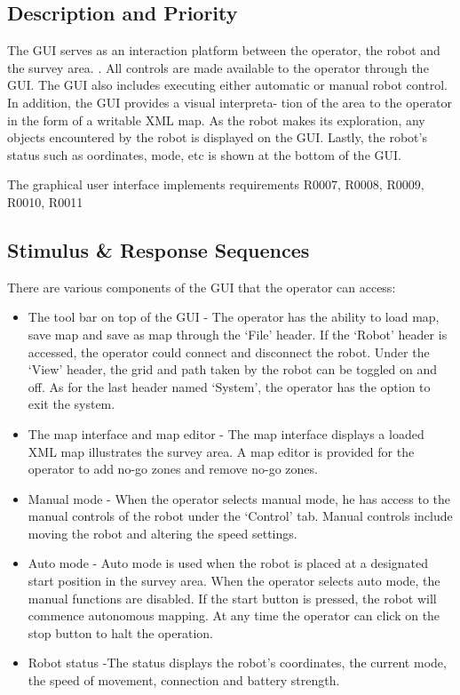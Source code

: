 \documentclass[11pt, a4paper]{report}
\begin{document}
\subsection {Description and Priority}
The GUI serves as an interaction platform between the operator, the robot and the survey area.
. All controls are made available to the operator through the GUI. The GUI also includes executing
either automatic or manual robot control. In addition, the GUI provides a visual interpreta-
tion of the area to the operator in the form of a writable XML map. As the robot
makes its exploration, any objects encountered by the robot is displayed on the GUI. Lastly, the robot's status such as
 oordinates, mode, etc is shown at the bottom of the GUI.

The graphical user interface implements requirements R0007, R0008, R0009, R0010, R0011

\subsection{Stimulus \& Response Sequences}

There are various components of the GUI that the operator can access:

\begin{itemize}
	\item The tool bar on top of the GUI - The operator has the ability to load map, save map and save as
	map through the `File' header. If the `Robot' header is accessed, the operator could connect and disconnect
	the robot. Under the `View' header, the grid and path taken by the robot can be toggled on and
	off. As for the last header named `System', the operator has the option to exit the system.
	\item The map interface and map editor - The map interface displays a loaded XML map illustrates the survey area. A map editor is provided for the operator to
	add no-go zones and remove no-go zones. 
	\item Manual mode - When the operator selects manual mode, he has access to the manual controls of
	the robot under the `Control' tab. Manual controls include moving the robot and altering the speed
	settings. 
	\item  Auto mode - Auto mode is used when the robot is placed at a designated start position in the
	survey area. When the operator selects auto mode, the manual functions are disabled. If the start button is
	pressed, the robot will commence autonomous mapping. At any time the operator can click
	on the stop button to halt the operation. 
	\item Robot status -The status displays the robot's coordinates, the current
	mode, the speed of movement, connection and battery strength.
\end{itemize}
\end{document}
